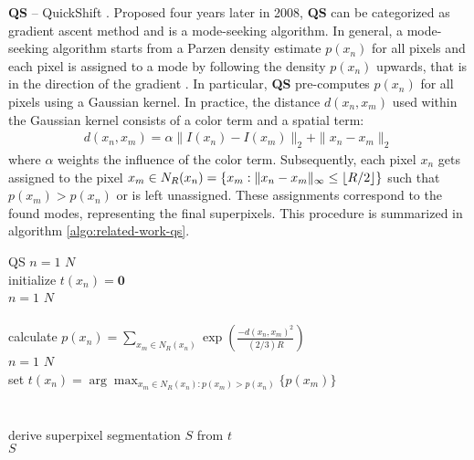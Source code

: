 \textbf{QS} -- QuickShift \cite{VedaldiSoatto:2008}. Proposed four years later in 2008, \textbf{QS} can be categorized as gradient ascent method and is a mode-seeking algorithm. In general, a mode-seeking algorithm starts from a Parzen density estimate $p(x_n)$ for all pixels and each pixel is assigned to a mode by following the density $p(x_n)$ upwards, that is in the direction of the gradient \cite{VedaldiSoatto:2008}. In particular, \textbf{QS} pre-computes $p(x_n)$ for all pixels using a Gaussian kernel. In practice, the distance $d(x_n,x_m)$ used within the Gaussian kernel consists of a color term and a spatial term:
\begin{align}
	\label{eq:related-work-quickshift-distance}
	d(x_n,x_m) = \alpha\|I(x_n) - I(x_m)\|_2 + \|x_n - x_m\|_2
\end{align}
where $\alpha$ weights the influence of the color term. Subsequently, each pixel $x_n$ gets assigned to the pixel $x_m \in N_R(x_n) = \{x_m : \|x_n - x_m\|_\infty \leq \floor*{R/2}\}$ such that $p(x_m) > p(x_n)$ or is left unassigned. These assignments correspond to the found modes, representing the final superpixels. This procedure is summarized in algorithm \ref{algo:related-work-qs}.
\begin{algorithm}[t]
	\begin{algo}{QS}{\label{algo:related-work-qs}}
		\qfor $n = 1$ \qto $N$\\
			initialize $t(x_n) = \boldsymbol 0$\qrof\\
		\qfor $n = 1$ \qto $N$\\
			\\
			calculate $p(x_n) = \sum_{x_m \in N_R(x_n)} \exp\left(\frac{-d(x_n,x_m)^2}{(2/3) R}\right)$ \qrof\\
		\qfor $n = 1$ \qto $N$\\
			set $t(x_n) = \arg\max_{x_m \in N_R(x_n): p(x_m) > p(x_n)} \{p(x_m)\}$\qrof\\
		\\
		\\
		derive superpixel segmentation $S$ from $t$\\
		\qreturn $S$
	\end{algo}
	\caption{The superpixel algorithm \textbf{QS} proposed in \cite{VedaldiSoatto:2008}.}
	\label{fig:related-work-qs-algorithm}
\end{algorithm}

